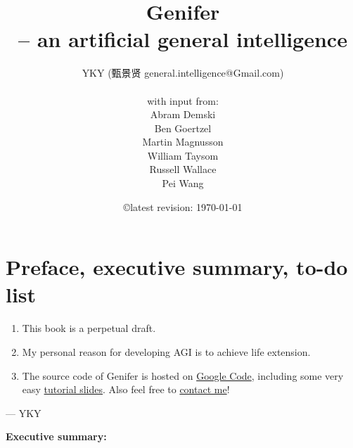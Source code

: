 \documentclass[12pt, UTF8, a4paper]{report}
\title{\textbf{Genifer\\-- an artificial general intelligence}}
\author{YKY (甄景贤 general.intelligence@Gmail.com)\\ \\
with input from:\\
Abram Demski\\
Ben Goertzel\\
Martin Magnusson\\
William Taysom\\
Russell Wallace\\
Pei Wang
}
\date{\copyright \quad latest revision: \today}
\theoremstyle{examples} \newtheorem{example}{Example}[section]
\begin{document}
\renewcommand{\normalsize}{\sffamily\fontsize{12pt}{15pt}\selectfont}
\fontsize{12pt}{15pt} \selectfont


\maketitle
\dominitoc

\setcounter{chapter}{-1}
\chapter{Preface, executive summary, to-do list}

\begin{enumerate}

\item  This book is a perpetual draft.

\item  My personal reason for developing AGI is to achieve life extension.

\item  The source code of $\mbox{Genifer}$ is hosted on \href{http://code.google.com/p/genifer/}{Google Code}, including some very easy \href{http://code.google.com/p/genifer/downloads/list}{tutorial slides}.  Also feel free to \href{mailto:Generic.Intelligence@Gmail.com}{contact me}!

\end{enumerate}

\begin{flushright}
--- YKY
\end{flushright}

{\sffamily\bfseries\Huge Executive summary:}
\end{document}
